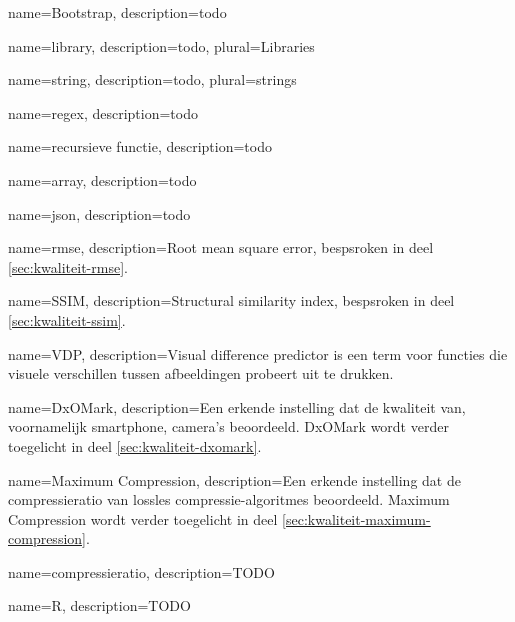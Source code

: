 {
	name={Bootstrap},
	description={todo}
}

{
	name={library},
	description={todo},
	plural={Libraries}
}

{
	name={string},
	description={todo},
	plural={strings}
}

{
	name={regex},
	description={todo}
}

{
	name={recursieve functie},
	description={todo}
}

{
	name={array},
	description={todo}
}

{
	name={json},
	description={todo}
}

{
	name={rmse},
	description={Root mean square error, bespsroken in deel \ref{sec:kwaliteit-rmse}.}
}

{
	name={SSIM},
	description={Structural similarity index, bespsroken in deel \ref{sec:kwaliteit-ssim}.}
}

{
	name={VDP},
	description={Visual difference predictor is een term voor functies die visuele verschillen tussen afbeeldingen probeert uit te drukken.}
}

{
	name={DxOMark},
	description={Een erkende instelling dat de kwaliteit van, voornamelijk smartphone, camera's beoordeeld. DxOMark wordt verder toegelicht in deel \ref{sec:kwaliteit-dxomark}.}
}

{
	name={Maximum Compression},
	description={Een erkende instelling dat de compressieratio van lossles compressie-algoritmes beoordeeld. Maximum Compression wordt verder toegelicht in deel \ref{sec:kwaliteit-maximum-compression}.}
}

{
	name={compressieratio},
	description={TODO}
}

{
	name={R},
	description={TODO}
}

